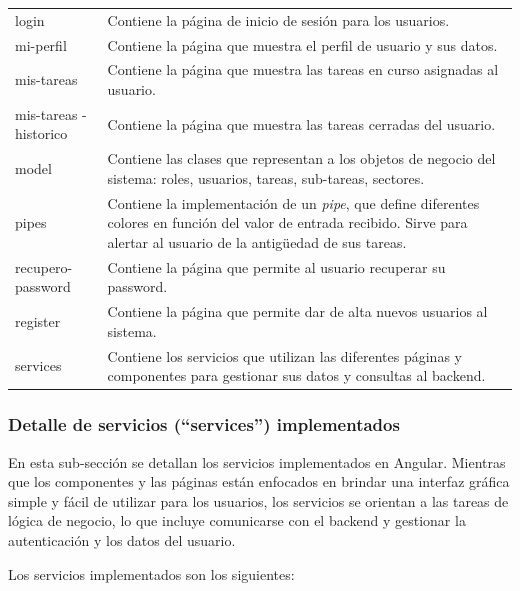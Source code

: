 \begin{table}[h]
\begin{tabular}{p{2.3cm} p{10.7cm}}
login & Contiene la página de inicio de sesión para los usuarios. \\
mi-perfil & Contiene la página que muestra el perfil de usuario y sus datos. \\
mis-tareas & Contiene la página que muestra las tareas en curso asignadas al usuario. \\
mis-tareas
-historico & Contiene la página que muestra las tareas cerradas del usuario. \\
model & Contiene las clases que representan a los objetos de negocio del sistema: roles, usuarios, tareas, sub-tareas, sectores. \\
pipes & Contiene la implementación de un \textit{pipe}, que define diferentes colores en función del valor de entrada recibido. Sirve para alertar al usuario de la antigüedad de sus tareas. \\
recupero-password & Contiene la página que permite al usuario recuperar su password. \\
register & Contiene la página que permite dar de alta nuevos usuarios al sistema. \\
services & Contiene los servicios que utilizan las diferentes páginas y componentes para gestionar sus datos y consultas al backend. \\
		\bottomrule
		\hline
	\end{tabular}
	\label{tab:carpetasFrontend}
\end{table}

\clearpage
\subsubsection{Detalle de servicios (``services'') implementados}
En esta sub-sección se detallan los servicios implementados en Angular. Mientras que los componentes y las páginas están enfocados en brindar una interfaz gráfica simple y fácil de utilizar para los usuarios, los servicios se orientan a las tareas de lógica de negocio, lo que incluye comunicarse con el backend y gestionar la autenticación y los datos del usuario.

Los servicios implementados son los siguientes:

